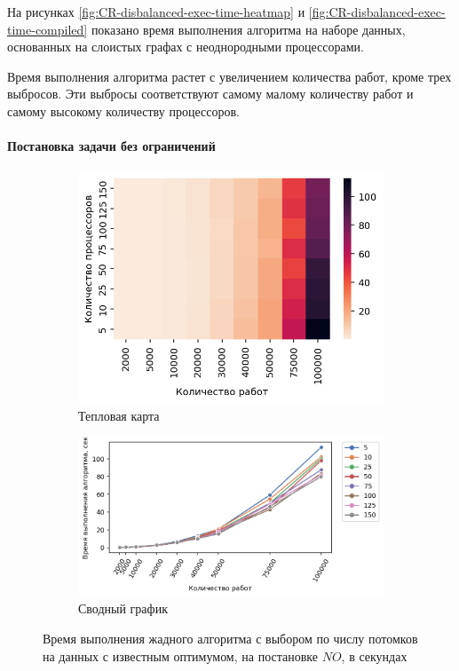 На рисунках \ref{fig:CR-disbalanced-exec-time-heatmap} и \ref{fig:CR-disbalanced-exec-time-compiled} показано время выполнения алгоритма на наборе данных, основанных на слоистых графах с неоднородными процессорами.

Время выполнения алгоритма растет с увеличением количества работ, кроме трех выбросов. Эти выбросы соответствуют самому малому количеству работ и самому высокому количеству процессоров.

\paragraph{Постановка задачи без ограничений}

\begin{figure}[!htbp]
    \centering
    \begin{subfigure}{0.49\textwidth}
        \includegraphics[width=\textwidth]{imgs/ideal_1/NO/et_heatmap.png}
        \caption{Тепловая карта}
        \label{fig:NO-exec-time-heatmap}
    \end{subfigure}
    \hfill
    \begin{subfigure}{0.49\textwidth}
        \includegraphics[width=\textwidth]{imgs/ideal_1/NO/tr_graph.png}
        \caption{Сводный график}
        \label{fig:NO-exec-time-compiled}
    \end{subfigure}
    \caption{Время выполнения жадного алгоритма с выбором по числу потомков на данных с известным оптимумом, на постановке $NO$, в секундах}
\end{figure}

